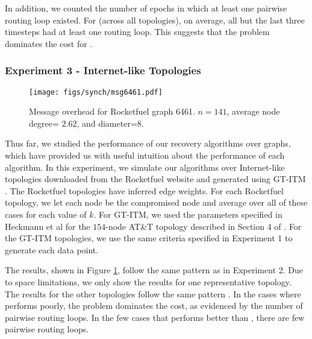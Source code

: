 In addition, we counted the number of epochs in which at least one pairwise routing loop existed.  For \second (across all topologies), on average, all but the last three 
timesteps had at least one routing loop.  This suggests that the \infinity problem dominates the cost for \seconds. 



\subsubsection{Experiment 3 - Internet-like Topologies}



\begin{figure}[t]
\centering
\texttt{[image: figs/synch/msg6461.pdf]}
\caption{Message overhead for Rocketfuel graph 6461. $n=141$, average node degree= $2.62$, and diameter=$8$.}
\label{fig:msg-real}
\end{figure} 

Thus far, we studied the performance of our recovery algorithms over \er graphs, which have provided us with useful intuition about the performance
of each algorithm. In this experiment, we simulate our algorithms over Internet-like topologies downloaded from the Rocketfuel website \cite{Rocketfuel} and generated using GT-ITM 
\cite{GT-ITM}.  The Rocketfuel topologies have inferred edge weights. For each Rocketfuel topology, we let each node be
the compromised node and average over all of these cases for each value of $k$.  For GT-ITM, we used the parameters specified in Heckmann et al \cite{Heckmann} for  the $154$-node AT\&T topology
described in Section 4 of \cite{Heckmann}. For the GT-ITM topologies, we use the same criteria specified in Experiment 1 to generate each data point. 

The results, shown in Figure \ref{fig:msg-real}, follow the same pattern as in Experiment 2.  Due to space limitations, we only show the results for one 
representative topology.  The results for the other topologies follow the same pattern \cite{Tech}. In the cases where \second performs poorly,
the \infinity problem dominates the cost, as evidenced by the number of pairwise routing loops. In the few cases that \second performs better than \purges, there 
are few pairwise routing loops.



